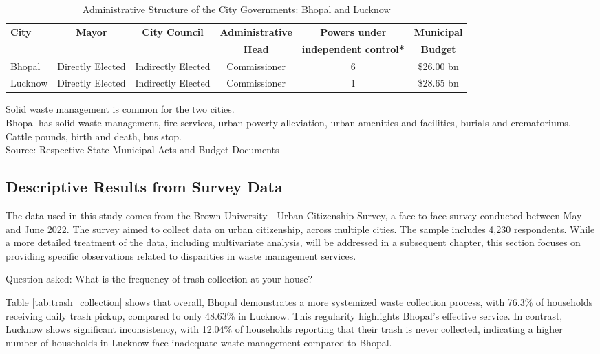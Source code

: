 \begin{table}[ht]
\centering
\caption{Administrative Structure of the City Governments: Bhopal and Lucknow}
\label{tab:admin_structure}
\begin{tabular}{|l|c|c|c|c|c|}
\hline
\textbf{City} & \textbf{Mayor} & \textbf{City Council} & \textbf{Administrative} & \textbf{Powers under} & \textbf{Municipal} \\
 & & & \textbf{Head} & \textbf{independent control*} & \textbf{Budget} \\
\hline
Bhopal & Directly Elected & Indirectly Elected & Commissioner & 6 & \$26.00 bn \\
\hline
Lucknow & Directly Elected & Indirectly Elected & Commissioner & 1 & \$28.65 bn \\
\hline
\end{tabular}
\raggedright
\small *Solid waste management is common for the two cities.\\
\small Bhopal has solid waste management, fire services, urban poverty alleviation, urban amenities and facilities, burials and crematoriums. Cattle pounds, birth and death, bus stop.\\
\small Source: Respective State Municipal Acts and Budget Documents
\end{table}

\subsection{Descriptive Results from Survey Data}

The data used in this study comes from the Brown University - Urban Citizenship Survey, a face-to-face survey conducted between May and June 2022. The survey aimed to collect data on urban citizenship, across multiple cities. The sample includes 4,230 respondents. While a more detailed treatment of the data, including multivariate analysis, will be addressed in a subsequent chapter, this section focuses on providing specific observations related to disparities in waste management services.

Question asked: What is the frequency of trash collection at your house?

Table \ref{tab:trash_collection} shows that overall, Bhopal demonstrates a more systemized waste collection process, with 76.3\% of households receiving daily trash pickup, compared to only 48.63\% in Lucknow. This regularity highlights Bhopal's effective service. In contrast, Lucknow shows significant inconsistency, with 12.04\% of households reporting that their trash is never collected, indicating a higher number of households in Lucknow face inadequate waste management compared to Bhopal.

